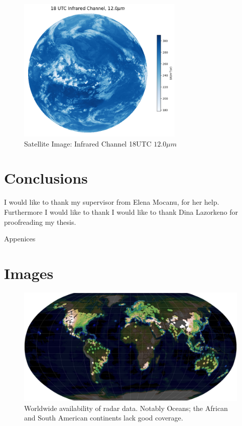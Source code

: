 \documentclass[acmtog, screen, balance]{acmart}
\begin{document}
\begin{figure}
    \centering
    \includegraphics[width=225pt]{./images/infrared.png}
    \caption{Satellite Image: Infrared Channel 18UTC $12.0\mu m$}
    \label{fig:infra}
\end{figure}


\section{Conclusions}


\begin{acks}
I would like to thank my supervisor from Elena Mocanu, for her help. Furthermore I would like to thank I would like to thank Dina Lazorkeno for proofreading my thesis.
\end{acks}




\newpage
\appendix
\large{Appenices}

\section{Images}

\begin{figure}[hbp]
  \centering
  \includegraphics[width=400pt]{./images/full-bams-d-18-0166.1-f1.jpg}
  \caption{Worldwide availability of radar data. Notably Oceans; the African and South American continents lack good coverage. \cite{AnOverviewofUsingWeatherRadarforClimatologicalStudiesSuccessesChallengesandPotential}}
  \Description{}
  \label{fig:radar-availability}
\end{figure}
\end{document}
